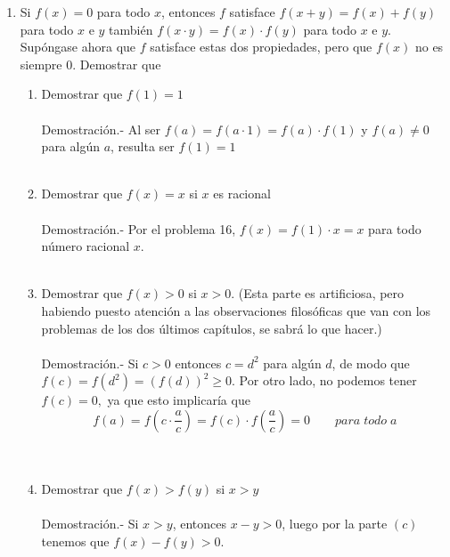 \begin{enumerate}
\begin{enumerate}[\bfseries (a)]
	\end{enumerate}

	\item Si $f(x)=0$ para todo $x$, entonces $f$ satisface $f(x+y)=f(x) + f(y)$ para todo $x$ e $y$ también $f(x\cdot y)=f(x)\cdot f(y)$ para todo $x$ e $y$. Supóngase ahora que $f$ satisface estas dos propiedades, pero que $f(x)$ no es siempre $0$. Demostrar que 

	\begin{enumerate}[\bfseries (a)]

	    \item Demostrar que $f(1)=1$\\\\
		Demostración.-\; Al ser $f(a)=f(a\cdot 1)=f(a)\cdot f(1)$ y $f(a)\neq 0$ para algún $a$, resulta ser $f(1)=1$\\\\

	    \item Demostrar que $f(x)=x$ si $x$ es racional \\\\
		Demostración.-\; Por el problema 16, $f(x)=f(1)\cdot x = x$ para todo número racional $x$. \\\\ 

	    \item Demostrar que $f(x)>0$ si $x>0$. (Esta parte es artificiosa, pero habiendo puesto atención a las observaciones filosóficas que van con los problemas de los dos últimos capítulos, se sabrá lo que hacer.)\\\\
		Demostración.-\; Si $c>0$ entonces $c=d^2$ para algún $d$, de modo que $f(c)=f(d^2)=(f(d))^2\geq 0$. Por otro lado, no podemos tener $f(c)=0,$ ya que esto implicaría que $$f(a)=f\left( c\cdot \dfrac{a}{c}\right) = f(c)\cdot f\left(\dfrac{a}{c}\right) = 0 \qquad para \; todo \; a$$\\\\

	    \item Demostrar que $f(x)>f(y)$ si $x>y$\\\\
		Demostración.-\; Si $x>y$, entonces $x-y>0$, luego por la parte $(c)$ tenemos que $f(x)-f(y)>0$. \\\\ 


\end{enumerate}
\end{enumerate}
